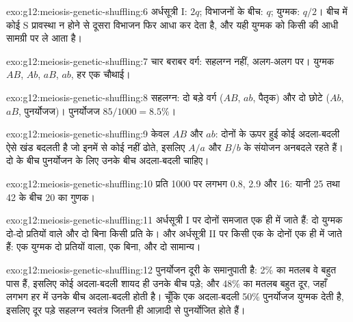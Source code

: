 \begin{solution}{exo:g12:meiosis-genetic-shuffling:6}
अर्धसूत्री I: $2q$; विभाजनों के बीच: $q$; युग्मक: $q/2$। बीच में कोई S
प्रावस्था न होने से दूसरा विभाजन  फिर आधा कर देता है, और यही युग्मक को
किसी   की आधी सामग्री पर ले आता है।
\end{solution}

\begin{solution}{exo:g12:meiosis-genetic-shuffling:7}
चार बराबर वर्ग: सहलग्न नहीं, अलग-अलग  पर। युग्मक $AB$, $Ab$,
$aB$, $ab$, हर एक चौथाई।
\end{solution}

\begin{solution}{exo:g12:meiosis-genetic-shuffling:8}
सहलग्न: दो बड़े वर्ग ($AB$, $ab$, पैतृक) और दो छोटे ($Ab$, $aB$,
पुनर्योजज)। पुनर्योजज $85/1000 = 8.5\%$।
\end{solution}

\begin{solution}{exo:g12:meiosis-genetic-shuffling:9}
केवल $AB$ और $ab$: दोनों  के ऊपर हुई कोई अदला-बदली ऐसे खंड बदलती है जो
इनमें से कोई नहीं ढोते, इसलिए $A/a$ और $B/b$ के संयोजन अनबदले रहते हैं। दो
 के बीच पुनर्योजन के लिए उनके बीच अदला-बदली चाहिए।
\end{solution}

\begin{solution}{exo:g12:meiosis-genetic-shuffling:10}
प्रति 1000 पर लगभग 0.8, 2.9 और 16: यानी 25 तथा 42 के बीच 20 का गुणक।
\end{solution}

\begin{solution}{exo:g12:meiosis-genetic-shuffling:11}
अर्धसूत्री I पर दोनों समजात एक ही  में जाते हैं: दो युग्मक दो-दो
प्रतियों वाले और दो बिना किसी प्रति के। और अर्धसूत्री II पर किसी एक
 के दोनों  एक ही  में जाते हैं: एक युग्मक दो
प्रतियों वाला, एक बिना, और दो सामान्य।
\end{solution}

\begin{solution}{exo:g12:meiosis-genetic-shuffling:12}
पुनर्योजन दूरी के समानुपाती है: 2\% का मतलब वे  बहुत पास हैं, इसलिए कोई
अदला-बदली शायद ही उनके बीच पड़े; और 48\% का मतलब बहुत दूर, जहाँ लगभग हर
 में उनके बीच अदला-बदली होती है। चूँकि एक अदला-बदली 50\%
पुनर्योजज युग्मक देती है, इसलिए दूर पड़े सहलग्न  स्वतंत्र  जितनी ही
आज़ादी से पुनर्योजित होते हैं।
\end{solution}

